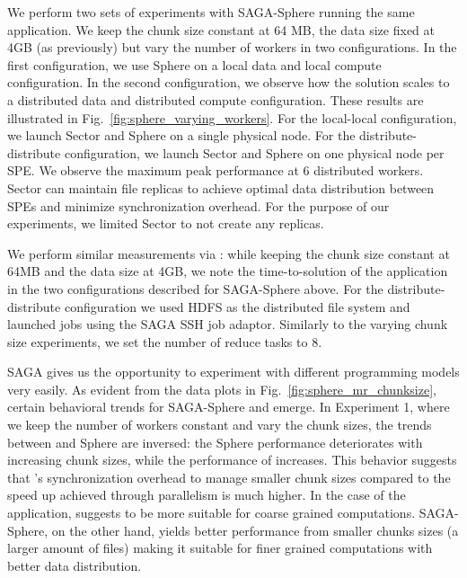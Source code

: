 \documentclass[3p,twocolumn]{elsarticle}
\begin{document}
We perform two sets of experiments with SAGA-Sphere running the same
\wc application.  We keep the chunk size constant at 64 MB, the
data size fixed at 4GB (as previously) but vary the number of workers
in two configurations. In the first configuration, we use Sphere on a
local data and local compute configuration. In the second
configuration, we observe how the solution scales to a distributed
data and distributed compute configuration. These results are
illustrated in Fig.~\ref{fig:sphere_varying_workers}.  For the local-local
configuration, we launch Sector and Sphere on a single physical node.
For the distribute-distribute configuration, we launch Sector and
Sphere on one physical node per SPE.  We observe the maximum peak
performance at 6 distributed workers. Sector can maintain file
replicas to achieve optimal data distribution between SPEs and
minimize synchronization overhead. For the purpose of our experiments,
we limited Sector to not create any replicas.

We perform similar measurements via \sagamapreduce: while keeping the
chunk size constant at 64MB and the data size at 4GB, we note the
time-to-solution of the \wc application in the two
configurations described for SAGA-Sphere above.  For the
distribute-distribute configuration we used HDFS as the distributed
file system and launched jobs using the SAGA SSH job adaptor.
Similarly to the varying chunk size experiments, we set the number of
reduce tasks to 8.  

SAGA gives us the opportunity to experiment with different programming models very easily. 
As evident from the data plots in Fig.~\ref{fig:sphere_mr_chunksize}, certain behavioral 
trends for SAGA-Sphere and \sagamapreduce emerge.  In Experiment 1, where we keep the 
number of workers constant and vary the chunk sizes, the trends between 
\sagamapreduce and Sphere are inversed: the Sphere performance deteriorates with 
increasing chunk sizes, while the performance of \sagamapreduce increases. This behavior
suggests that \sagamapreduce's synchronization overhead to manage smaller 
chunk sizes compared to the speed up achieved through parallelism is much higher. 
In the case of the \wc application, \sagamapreduce suggests to be more 
suitable for coarse grained computations. SAGA-Sphere, on the other hand, yields 
better performance from smaller chunks sizes (a larger amount of files) making it 
suitable for finer grained computations with better data distribution.
\end{document}

